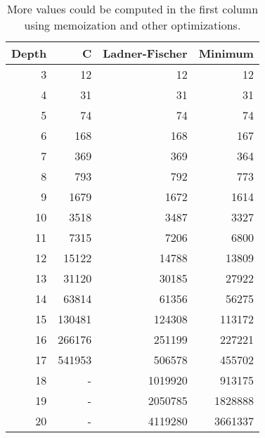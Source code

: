 \begin{table}
  \begin{tabular}{| r || r | r | r |}
    \hline
    Depth &      C & Ladner-Fischer & Minimum \\
    \hline
        3 &     12 &             12 &      12 \\
        4 &     31 &             31 &      31 \\
        5 &     74 &             74 &      74 \\
        6 &    168 &            168 &     167 \\
        7 &    369 &            369 &     364 \\
        8 &    793 &            792 &     773 \\
        9 &   1679 &           1672 &    1614 \\
       10 &   3518 &           3487 &    3327 \\
       11 &   7315 &           7206 &    6800 \\
       12 &  15122 &          14788 &   13809 \\
       13 &  31120 &          30185 &   27922 \\
       14 &  63814 &          61356 &   56275 \\
       15 & 130481 &         124308 &  113172 \\
       16 & 266176 &         251199 &  227221 \\
       17 & 541953 &         506578 &  455702 \\
       18 &      - &        1019920 &  913175 \\
       19 &      - &        2050785 & 1828888 \\
       20 &      - &        4119280 & 3661337 \\
    \hline              
  \end{tabular}         
  \caption{More values could be computed in the first column using memoization
  and other optimizations.}
\end{table}
